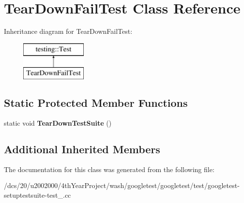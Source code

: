 \hypertarget{classTearDownFailTest}{}\section{Tear\+Down\+Fail\+Test Class Reference}
\label{classTearDownFailTest}
Inheritance diagram for Tear\+Down\+Fail\+Test\+:\begin{figure}[H]
\begin{center}
\leavevmode
\includegraphics[height=2.000000cm]{classTearDownFailTest}
\end{center}
\end{figure}
\subsection*{Static Protected Member Functions}
\begin{DoxyCompactItemize}
\item 
\mbox{\label{classTearDownFailTest_a99256ef875c06858c0106f431073ded2}} 
static void {\bfseries Tear\+Down\+Test\+Suite} ()
\end{DoxyCompactItemize}
\subsection*{Additional Inherited Members}


The documentation for this class was generated from the following file\+:\begin{DoxyCompactItemize}
\item 
/dcs/20/u2002000/4th\+Year\+Project/wash/googletest/googletest/test/googletest-\/setuptestsuite-\/test\+\_\+.\+cc\end{DoxyCompactItemize}
